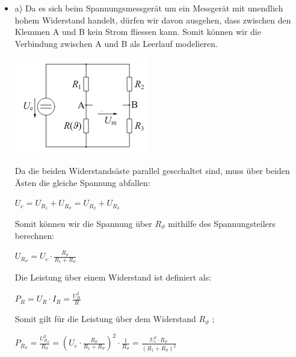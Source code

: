 \begin{itemize}
  \item a) Da es sich beim Spannungsmessgerät um ein Messgerät mit unendlich hohem Widerstand handelt, dürfen wir davon ausgehen, dass zwischen den Klemmen A und B kein Strom fliessen kann. Somit können wir die Verbindung zwischen A und B als Leerlauf modelieren.
  \begin{center}
      \includegraphics[scale=2.5]{katalog/katalog-1/a2-1.png}
  \end{center}
  Da die beiden Widerstandsäste parallel gescchaltet sind, muss über beiden Ästen die gleiche Spannung abfallen:
  \begin{center}
    $U_e = U_{R_1} + U_{R_\vartheta} = U_{R_2} +U_{R_3}$
  \end{center}
  Somit können wir die Spannung über $R_\vartheta$ mithilfe des Spannungsteilers berechnen:
  \begin{center}
      $U_{R_\vartheta} = U_e \cdot \frac{R_\vartheta}{R_1 + R_\vartheta}$
  \end{center}
  Die Leistung über einem Widerstand ist definiert als:
  \begin{center}
    $P_R = U_R \cdot I_R = \frac{U_R^2}{R}$
  \end{center}
  Somit gilt für die Leistung über dem Widerstand $R_\vartheta$ ;
  \begin{center}
      $P_{R_\vartheta} = \frac{U_{R_\vartheta}^2}{R_\vartheta} = (U_e \cdot \frac{R_\vartheta}{R_1 + R_\vartheta})^2 \cdot \frac{1}{R_\vartheta} =  \frac{U_e^2 \cdot R_\vartheta}{(R_1 + R_\vartheta)^2} $
  \end{center}


\end{itemize}
